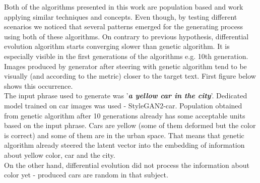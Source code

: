 \documentclass[11pt,a4paper,openany]{book}
\begin{document}
\noindent Both of the algorithms presented in this work are population based and work applying similar techniques and concepts. Even though, by testing different scenarios we noticed that several patterns emerged for the generating process using both of these algorithms.  On contrary to previous hypothesis, differential evolution algorithm starts converging slower than genetic algorithm. It is especially visible in the first generations of the algorithms e.g. 10th generation. Images produced by generator after steering with genetic algorithm tend to be visually (and according to the metric) closer to the target text. First figure below shows this occurrence.\\
The input phrase used to generate was '\textit{\textbf{a yellow car in the city}}'. Dedicated model trained on car images was used - StyleGAN2-car. Population obtained from genetic algorithm after 10 generations already has some acceptable units based on the input phrase. Cars are yellow (some of them deformed but the color is correct) and some of them are in the urban space. That means that genetic algorithm already steered the latent vector into the embedding of information about yellow color, car and the city.\\
On the other hand, differential evolution did not process the information about color yet - produced cars are random in that subject.

\newpage
\end{document}
